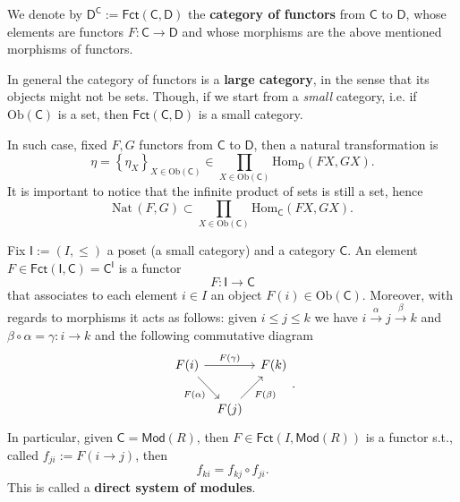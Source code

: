 \begin{defn}
	We denote by $\mathsf{D}^{\mathsf{C}} := \mathsf{Fct}\left(\mathsf{C}, \mathsf{D} \right)$ the \textbf{category of functors} from $\mathsf{C}$ to $\mathsf{D}$,
	whose elements are functors $F: \mathsf{C} \to \mathsf{D}$ and whose morphisms are the above mentioned morphisms of functors.
\end{defn}

\begin{rem}
	In general the category of functors is a \textbf{large category}, in the sense that its objects might not be sets.
	Though, if we start from a {\em small} category, i.e. if $\mathrm{Ob} \left(\mathsf{C}\right)$ is a set,
	then $\mathsf{Fct}\left(\mathsf{C}, \mathsf{D} \right) $ is a small category.

	In such case, fixed $F, G$ functors from $\mathsf{C}$ to $\mathsf{D}$, then a natural transformation is
	\begin{equation}
	\eta = \left\{ \eta_X \right\}_{X \in \mathrm{Ob} \left(\mathsf{C}\right)} \in \prod_{X \in \mathrm{Ob} \left(\mathsf{C}\right)} \mathrm{Hom}_{\mathsf{D}} \left( FX, GX \right)
	.\end{equation} 
	It is important to notice that the infinite product of sets is still a set, hence
	\begin{equation}
	\mathrm{Nat}\, \left(F, G\right) \subset \prod_{X \in \mathrm{Ob} \left(\mathsf{C}\right)} \mathrm{Hom}_{\mathsf{C}} \left( FX, GX \right)
	.\end{equation} 
\end{rem}

\begin{ex}
	Fix $\mathsf{I} := \left(I, \le\right)$ a poset (a small category) and a category $\mathsf{C}$.
	An element $F \in \mathsf{Fct}\left(\mathsf{I}, \mathsf{C} \right) = \mathsf{C}^{\mathsf{I}}$ is a functor
	\begin{equation}
	F: \mathsf{I} \to \mathsf{C}
	\end{equation} 
	that associates to each element $i \in I$ an object $F(i) \in \mathrm{Ob} \left(\mathsf{C}\right)$.
	Moreover, with regards to morphisms it acts as follows: given $i \leq j \le k$ we have $i \xrightarrow{\alpha} j \xrightarrow{\beta} k$ and $\beta \circ \alpha = \gamma : i \to k$ and the following commutative diagram
	\begin{equation}
	\begin{tikzcd}[column sep=tiny]
		F(i) \arrow[rr, "F(\gamma)", rightarrow] \arrow[rd, "F(\alpha)"', rightarrow] & & F(k)\\
			& F(j) \arrow[ru, "F(\beta)"', rightarrow] &
	\end{tikzcd}
	.\end{equation} 
	In particular, given $\mathsf{C} = \mathsf{Mod}\left( R \right)$, then $F \in \mathsf{Fct}\left(I, \mathsf{Mod}\left( R \right) \right)$ is a functor s.t., called $f_{ji} := F( i \to j)$, then
	\begin{equation}
		f_{ki} = f_{kj} \circ f_{ji}
	.\end{equation} 
	This is called a \textbf{direct system of modules}.
\end{ex} 

